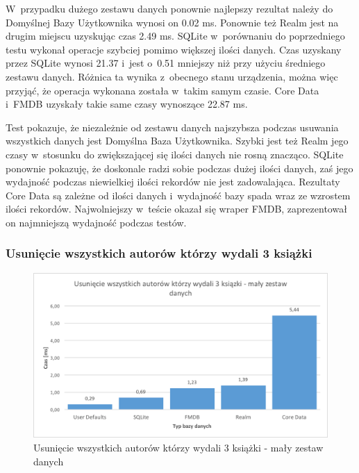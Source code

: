  W~przypadku dużego zestawu danych ponownie najlepszy rezultat należy do Domyślnej Bazy Użytkownika wynosi on 0.02 ms. Ponownie też Realm jest na drugim miejscu uzyskując czas 2.49 ms. SQLite w~porównaniu do poprzedniego testu wykonał operacje szybciej pomimo większej ilości danych. Czas uzyskany przez SQLite wynosi 21.37 i~jest o~0.51 mniejszy niż przy użyciu średniego zestawu danych. Różnica ta wynika z~obecnego stanu urządzenia, można więc przyjąć, że operacja wykonana została w~takim samym czasie. Core Data i~FMDB uzyskały takie same czasy wynoszące 22.87 ms. 

Test pokazuje, że niezależnie od zestawu danych najszybsza podczas usuwania wszystkich danych jest Domyślna Baza Użytkownika. Szybki jest też Realm jego czasy w~stosunku do zwiększającej się ilości danych nie rosną znacząco. SQLite ponownie pokazuję, że doskonale radzi sobie podczas dużej ilości danych, zaś jego wydajność podczas niewielkiej ilości rekordów nie jest zadowalająca. Rezultaty Core Data są zależne od ilości danych i~wydajność bazy spada wraz ze wzrostem ilości rekordów. Najwolniejszy w~teście okazał się wraper FMDB, zaprezentował on najmniejszą wydajność podczas testów. 

\subsubsection{Usunięcie wszystkich autorów którzy wydali 3 książki}

\begin{figure}[H]
    \centering\includegraphics[width=\linewidth]{img/delete_data/delete_by_author/delete_by_author_small_test.png}
    \caption{Usunięcie wszystkich autorów którzy wydali 3 książki - mały zestaw danych}
    \label{img: delete-by-author-small}
\end{figure}

